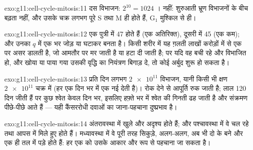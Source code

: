 \begin{solution}{exo:g11:cell-cycle-mitosis:11}
दस विभाजन: $2^{10} = 1024$ । नहीं: शुरुआती भ्रूण विभाजनों के बीच
बढ़ता नहीं, और उसके चक्र लगभग पूरे S तथा M ही होते हैं, $\mathrm{G_1}$
मुश्किल से ही।
\end{solution}

\begin{solution}{exo:g11:cell-cycle-mitosis:12}
एक पुत्री में 47  होते हैं (एक अतिरिक्त), दूसरी में 45 (एक कम);
और उनका  $q$ में एक  भर जोड़ या घटाकर बनता है। किसी शरीर
 में यह ग़लती लाखों करोड़ों में से एक  पर असर डालती है, जो
आमतौर पर मर जाती है या हटा दी जाती है; पर यदि वह  बची रहे और
विभाजित हो, और खोया या पाया गया  उसकी वृद्धि का नियंत्रण बिगाड़
दे, तो कोई अर्बुद शुरू हो सकता है।
\end{solution}

\begin{solution}{exo:g11:cell-cycle-mitosis:13}
प्रति दिन लगभग $\num{2e11}$ विभाजन, यानी किसी भी क्षण $\num{2e11}$
 चक्र में (हर एक दिन भर में एक नई  देती है)।  रोक देने से आपूर्ति रुक जाती है; लाल  120 दिन जीती हैं पर
कुछ श्वेत  केवल दिन भर, इसलिए हफ़्ते भर में श्वेत  की
गिनती ढह जाती है और संक्रमण पीछे-पीछे आते हैं --- यही कैंसररोधी दवाओं का
जाना-पहचाना दुष्प्रभाव है।
\end{solution}

\begin{solution}{exo:g11:cell-cycle-mitosis:14}
अंतरावस्था में  खुले और अदृश्य होते हैं; और पश्चावस्था में वे चल
रहे तथा आपस में मिले हुए होते हैं। मध्यावस्था में वे पूरी तरह सिकुड़े,
अलग-अलग, अब भी दो  के बने और एक ही तल में पड़े होते हैं: हर एक
को उसके आकार और रूप से पहचाना जा सकता है।
\end{solution}

